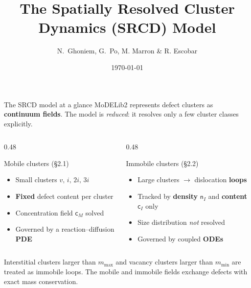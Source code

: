 \documentclass[aspectratio=169,10pt]{beamer}
\title[SRCD Model in MoDELib2]{The Spatially Resolved Cluster Dynamics (SRCD) Model}
\author[Ghoniem]{N.\ Ghoniem, G.\ Po, M. Marron \& R. Escobar}
\institute[MMS]{Multiscale Materials Solutions --- Deliverable D1/M1}
\date{\today}
\newcommand{\sa}[1]{\bm{\mathsf{#1}}}
\begin{document}
{
\begin{frame}
  \titlepage
  \vspace{-1.2em}
  \footnotesize 
\end{frame}
}

\begin{frame}{The SRCD model at a glance}
MoDELib2 represents defect clusters as \textbf{continuum fields}. The model is
\emph{reduced}: it resolves only a few cluster classes explicitly.
\vfill
\begin{columns}[T]
\begin{column}{0.48\textwidth}
\begin{block}{Mobile clusters (\S2.1)}
\small
\begin{itemize}
  \item Small clusters $v,\,i,\,2i,\,3i$
  \item \textbf{Fixed} defect content per cluster
  \item Concentration field $\sa{c}_M$ solved
  \item Governed by a reaction--diffusion \textbf{PDE}
\end{itemize}
\end{block}
\end{column}
\begin{column}{0.48\textwidth}
\begin{block}{Immobile clusters (\S2.2)}
\small
\begin{itemize}
  \item Large clusters $\to$ dislocation \textbf{loops}
  \item Tracked by \textbf{density} $\sa{n}_I$ and \textbf{content} $\sa{c}_I$ only
  \item Size distribution \emph{not} resolved
  \item Governed by coupled \textbf{ODEs}
\end{itemize}
\end{block}
\end{column}
\end{columns}
\vfill
\footnotesize
Interstitial clusters larger than $m_{\max}$ and vacancy clusters larger than
$m_{\min}$ are treated as immobile loops. The mobile and immobile fields exchange
defects with exact mass conservation.
\end{frame}
\end{document}
